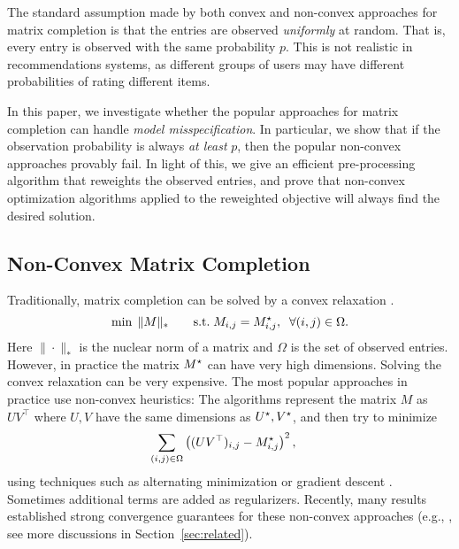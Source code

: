 The standard assumption made by both convex and non-convex approaches for matrix completion is that the entries are observed {\em uniformly} at random. That is, every entry is observed with the same probability $p$. This is not realistic in recommendations systems, as different groups of users may have different probabilities of rating different items.

In this paper, we investigate whether the popular approaches for matrix completion can handle {\em model misspecification}. In particular, we show that if the observation probability is always {\em at least} $p$, then the popular non-convex approaches provably fail. In light of this, we give an efficient pre-processing algorithm that reweights the observed entries, and prove that non-convex optimization algorithms applied to the reweighted objective will always find the desired solution.

\subsection{Non-Convex Matrix Completion}

%

Traditionally, matrix completion can be solved by a convex relaxation \citep{candes2010power}.
\[
\min \; \|M\|_* \qquad \mathrm{s.t.} \; M_{i,j} = M^\star_{i,j}, \; \; \forall (i,j)\in \Omega.
\]
Here $\|\cdot\|_*$ is the nuclear norm of a matrix and $\Omega$ is the set of observed entries.
However, in practice the matrix $M^\star$ can have very high dimensions. Solving the convex relaxation can be very expensive. The most popular approaches in practice use non-convex heuristics: The algorithms represent the matrix $M$ as $UV^\top$ where $U,V$ have the same dimensions as $U^\star, V^\star$, and then try to minimize %
\begin{align*}
\sum_{(i,j)\in \Omega} & \left((UV^\top)_{i,j} - M^\star_{i,j}\right)^2,
\end{align*}
using techniques such as alternating minimization \citep{koren2009bellkor} or gradient descent \citep{rennie2005fast}. Sometimes additional terms are added as regularizers. Recently, many results established strong convergence guarantees for these non-convex approaches (e.g., \citep{jain2013low,sun2015guaranteed,ge2016matrix}, see more discussions in Section~\ref{sec:related}).

